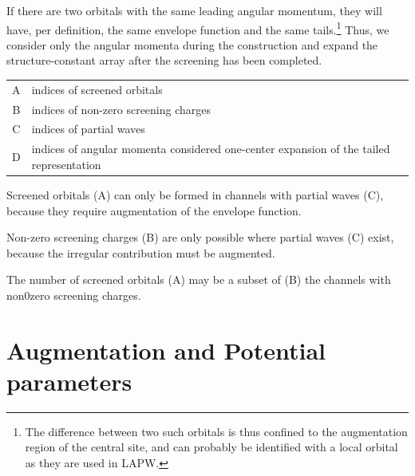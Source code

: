 \documentclass[11pt,a4paper]{report}
\begin{document}
If there are two orbitals with the same leading angular momentum, they
will have, per definition, the same envelope function and the same
tails.\footnote{The difference between two such orbitals is thus
  confined to the augmentation region of the central site, and can
  probably be identified with a local orbital as they are used in
  LAPW.} Thus, we consider only the angular momenta during the
construction and expand the structure-constant array after the
screening has been completed.

\begin{center}
\begin{tabular}{|c|l|}
\hline
A&indices of screened orbitals\\
B&indices of non-zero screening charges\\
C&indices of partial waves\\
D&indices of angular momenta considered one-center expansion of 
the tailed representation\\
\hline
\end{tabular}
\end{center}

Screened orbitals (A) can only be formed in channels with partial waves (C),
because they require augmentation of the envelope function.

Non-zero screening charges (B) are only possible where partial waves (C)
exist, because the irregular contribution must be augmented.

The number of screened orbitals (A) may be a subset of (B) the
channels with non0zero screening charges.

\section{Augmentation and Potential parameters}
\end{document}
